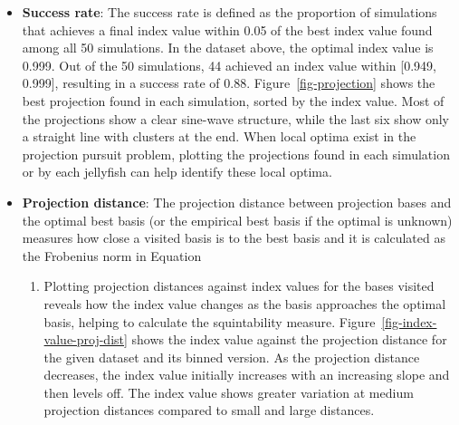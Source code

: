 \documentclass[
  number,
  preprint,
  3p]{elsarticle}
\providecommand{\tightlist}{%
  \setlength{\itemsep}{0pt}\setlength{\parskip}{0pt}}\usepackage{longtable,booktabs,array}
\begin{document}
\begin{itemize}
\item
  \textbf{Success rate}: The success rate is defined as the proportion
  of simulations that achieves a final index value within 0.05 of the
  best index value found among all 50 simulations. In the dataset above,
  the optimal index value is 0.999. Out of the 50 simulations, 44
  achieved an index value within {[}0.949, 0.999{]}, resulting in a
  success rate of 0.88. Figure~\ref{fig-projection} shows the best
  projection found in each simulation, sorted by the index value. Most
  of the projections show a clear sine-wave structure, while the last
  six show only a straight line with clusters at the end. When local
  optima exist in the projection pursuit problem, plotting the
  projections found in each simulation or by each jellyfish can help
  identify these local optima.
\item
  \textbf{Projection distance}: The projection distance between
  projection bases and the optimal best basis (or the empirical best
  basis if the optimal is unknown) measures how close a visited basis is
  to the best basis and it is calculated as the Frobenius norm in
  Equation

  \begin{enumerate}
  \def\labelenumi{\arabic{enumi}.}
  \tightlist
  \item
    Plotting projection distances against index values for the bases
    visited reveals how the index value changes as the basis approaches
    the optimal basis, helping to calculate the squintability measure.
    Figure~\ref{fig-index-value-proj-dist} shows the index value against
    the projection distance for the given dataset and its binned
    version. As the projection distance decreases, the index value
    initially increases with an increasing slope and then levels off.
    The index value shows greater variation at medium projection
    distances compared to small and large distances.
  \end{enumerate}
\end{itemize}
\end{document}
